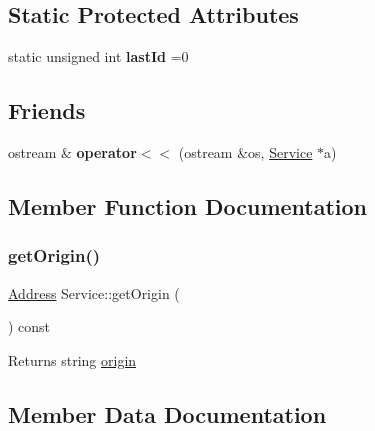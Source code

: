 \subsection*{Static Protected Attributes}
\begin{DoxyCompactItemize}
\item 
\mbox{\label{class_service_aa80a6461b0877972c7bbd427cff39175}} 
static unsigned int {\bfseries last\+Id} =0
\end{DoxyCompactItemize}
\subsection*{Friends}
\begin{DoxyCompactItemize}
\item 
\mbox{\label{class_service_a641fd7efe1dd35ea19ac062c4e2ece45}} 
ostream \& {\bfseries operator$<$$<$} (ostream \&os, \hyperlink{class_service}{Service} $\ast$a)
\end{DoxyCompactItemize}


\subsection{Member Function Documentation}
\mbox{\label{class_service_a186e0115cc0197181b4e060bfe4cd502}} 
\subsubsection{\texorpdfstring{get\+Origin()}{getOrigin()}}
{\footnotesize\ttfamily \hyperlink{class_address}{Address} Service\+::get\+Origin (\begin{DoxyParamCaption}{ }\end{DoxyParamCaption}) const}

\begin{DoxyReturn}{Returns}
string \hyperlink{class_service_a4abd0a104d97e5bdb8e8ca93bab31ce7}{origin} 
\end{DoxyReturn}


\subsection{Member Data Documentation}
\mbox{\label{class_service_a4abd0a104d97e5bdb8e8ca93bab31ce7}} 
